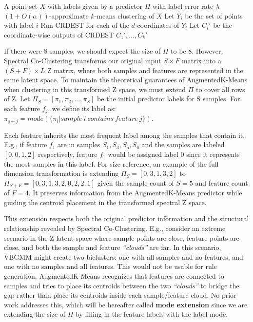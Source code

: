 \begin{algorithm}[H]
\caption{Learning-augmented k-means clustering}
\label{alg:learning-kmeans}
\begin{algorithmic}[1]
\Require A point set $X$ with labels given by a predictor $\Pi$ with label error rate $\lambda$
\Ensure $(1 + O(\alpha))$-approximate $k$-means clustering of $X$
    \State Let $Y_i$ be the set of points with label $i$
    \State Run \textsc{CRDEST} for each of the $d$ coordinates of $Y_i$
    \State Let $C_i'$ be the coordinate-wise outputs of \textsc{CRDEST}
\EndFor
\State \Return $C_1', \ldots, C_k'$
\end{algorithmic}
\end{algorithm}

If there were 8 samples, we should expect the size of $\Pi$ to be 8. However, Spectral Co-Clustering transforms our original input $S\times{}F$ matrix into a $(S + F)\times{}L$ Z matrix, where both samples and features are represented in the same latent space.  To maintain the theoretical guarantees of AugmentedK-Means when clustering in this transformed Z space, we must extend $\Pi$ to cover all rows of Z. Let $\Pi_{S} = [\pi_1, \pi_2, ..., \pi_S]$ be the initial predictor labels for S samples. For each feature $f_j$, we define its label as: $\pi_{s+j} = mode(\{\pi_i | sample\ i\ contains\ feature\ j\})$.



Each feature inherits the most frequent label among the samples that contain it. E.g., if feature $f_1$ are in samples $S_1, S_3, S_5, S_6$ and the samples are labeled $[0, 0, 1, 2]$ respectively, feature $f_1$ would be assigned label $0$ since it represents the most samples in this label. For size reference, an example of the full dimension transformation is extending $\Pi_{S} = [0, 3, 1, 3, 2]$ to $\Pi_{S + F} = [0, 3, 1, 3, 2, 0, 2, 2, 1]$ given the sample count of $S = 5$ and feature count of $F=4$. It preserves information from the AugmentedK-Means predictor while guiding the centroid placement in the transformed spectral Z space.

 This extension respects both the original predictor information and the structural relationship revealed by Spectral Co-Clustering. E.g., consider an extreme scenario in the Z latent space where sample points are close, feature points are close, and both the sample and feature \textit{``clouds''} are far. In this scenario, VBGMM might create two biclusters: one with all samples and no features, and one with no samples and all features. This would not be usable for rule generation. AugmentedK-Means recognizes that features are connected to samples and tries to place its centroids between the two \textit{``clouds''} to bridge the gap rather than place its centroids inside each sample/feature cloud. No prior work addresses this, which will be hereafter called \textbf{mode extension} since we are extending the size of $\Pi$ by filling in the feature labels with the label mode.




